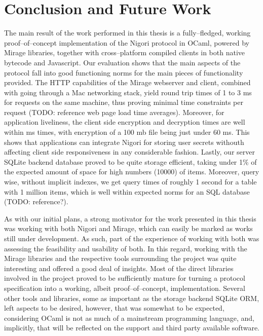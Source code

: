 \chapter{Conclusion and Future Work} \label{chapter:conclusion}
The main result of the work performed in this thesis is a fully--fledged, working proof--of--concept implementation of the Nigori protocol in OCaml, powered by Mirage libraries, together with cross--platform compiled clients in both native bytecode and Javascript.
Our evaluation shows that the main aspects of the protocol fall into good functioning norms for the main pieces of functionality provided.
The HTTP capabilities of the Mirage webserver and client, combined with going through a Mac networking stack, yield round trip times of 1 to 3 ms for requests on the same machine, thus proving minimal time constraints per request (TODO: reference web page load time averages).
Moreover, for application liveliness, the client side encryption and decryption times are well within ms times, with  encryption of a 100 mb file being just under 60 ms.
This shows that applications can integrate Nigori for storing user secrets withouth affecting client side responsiveness in any considerable fashion.
Lastly, our server SQLite backend database proved to be quite storage efficient, taking under 1\% of the expected amount of space for high numbers (10000) of items.
Moreover, query wise, without implicit indexes, we get query times of roughly 1 second for a table with 1 million items, which is well within expected norms for an SQL database (TODO: reference?).

As with our initial plans, a strong motivator for the work presented in this thesis was working with both Nigori and Mirage, which can easily be marked as works still under development.
As such, part of the experience of working with both was assessing the feasibility and usability of both.
In this regard, working with the Mirage libraries and the respective tools surrounding the project was quite interesting and offered a good deal of insights.
Most of the direct libraries involved in the project proved to be sufficiently mature for turning a protocol specification into a working, albeit proof--of--concept, implementation.
Several other tools and libraries, some as important as the storage backend SQLite ORM, left aspects to be desired, however, that was somewhat to be expected, considering OCaml is not as much of a mainstream programming language, and, implicitly, that will be reflected on the support and third party available software.

